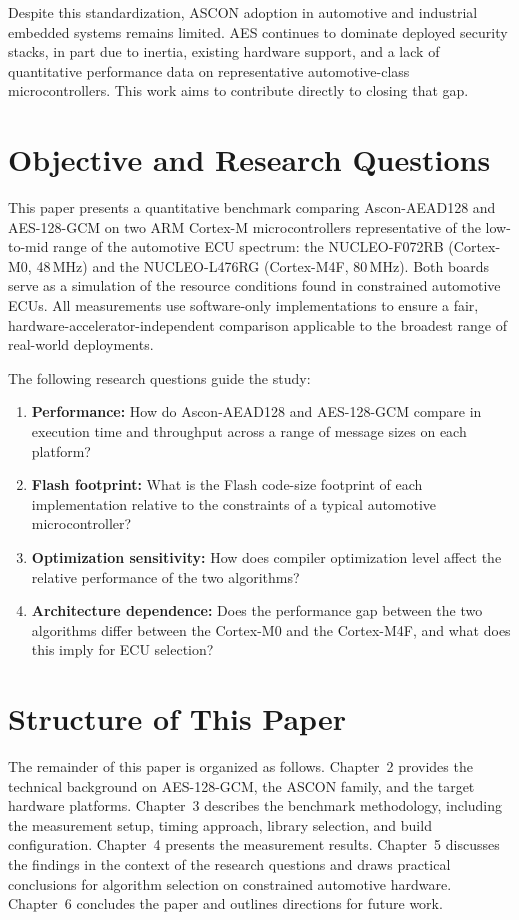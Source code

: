 Despite this standardization, ASCON adoption in automotive and industrial
embedded systems remains limited.
AES continues to dominate deployed security stacks, in part due to inertia,
existing hardware support, and a lack of quantitative performance data on
representative automotive-class microcontrollers.
This work aims to contribute directly to closing that gap.

\section{Objective and Research Questions}

This paper presents a quantitative benchmark comparing Ascon-AEAD128 and
AES-128-GCM on two ARM Cortex-M microcontrollers representative of the
low-to-mid range of the automotive ECU spectrum: the NUCLEO-F072RB
(Cortex-M0, 48\,MHz) and the NUCLEO-L476RG (Cortex-M4F, 80\,MHz).
Both boards serve as a simulation of the resource conditions found in
constrained automotive ECUs.
All measurements use software-only implementations to ensure a fair,
hardware-accelerator-independent comparison applicable to the broadest range of
real-world deployments.

The following research questions guide the study:
\begin{enumerate}\tightlist
  \item \textbf{Performance:} How do Ascon-AEAD128 and AES-128-GCM compare in
        execution time and throughput across a range of message sizes on each
        platform?
  \item \textbf{Flash footprint:} What is the Flash code-size footprint of each
        implementation relative to the constraints of a typical automotive
        microcontroller?
  \item \textbf{Optimization sensitivity:} How does compiler optimization level
        affect the relative performance of the two algorithms?
  \item \textbf{Architecture dependence:} Does the performance gap between the
        two algorithms differ between the Cortex-M0 and the Cortex-M4F, and what
        does this imply for ECU selection?
\end{enumerate}

\section{Structure of This Paper}

The remainder of this paper is organized as follows.
Chapter~2 provides the technical background on AES-128-GCM, the ASCON family,
and the target hardware platforms.
Chapter~3 describes the benchmark methodology, including the measurement setup,
timing approach, library selection, and build configuration.
Chapter~4 presents the measurement results.
Chapter~5 discusses the findings in the context of the research questions and
draws practical conclusions for algorithm selection on constrained automotive
hardware.
Chapter~6 concludes the paper and outlines directions for future work.
